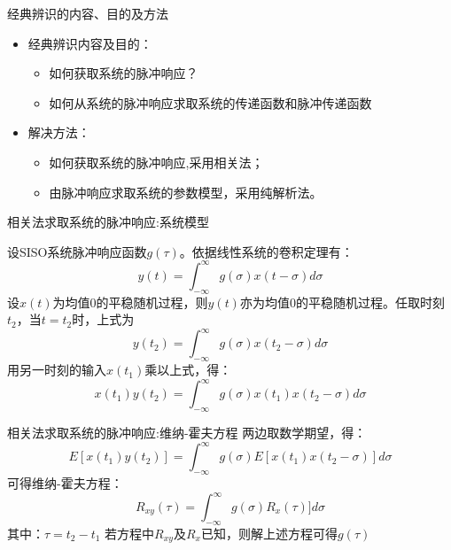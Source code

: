 \begin{frame}{经典辨识的内容、目的及方法}
\begin{itemize}
\item 经典辨识内容及目的：
\begin{itemize}
\item 如何获取系统的脉冲响应？
\item 如何从系统的脉冲响应求取系统的传递函数和脉冲传递函数
\end{itemize}
\item 解决方法：
\begin{itemize}
\item 如何获取系统的脉冲响应,采用相关法；
\item 由脉冲响应求取系统的参数模型，采用纯解析法。
\end{itemize}
\end{itemize}
\end{frame}

\begin{frame}{相关法求取系统的脉冲响应:系统模型}

设SISO系统脉冲响应函数$g(\tau)$。依据线性系统的卷积定理有：
$$
y(t)=\int_{-\infty}^{\infty} g(\sigma)x(t-\sigma)d\sigma
$$
设$x(t)$为均值$0$的平稳随机过程，则$y(t)$亦为均值$0$的平稳随机过程。任取时刻$t_2$，当$t=t_2$时，上式为
$$
y(t_2)=\int_{-\infty}^{\infty} g(\sigma)x(t_2-\sigma)d\sigma
$$
用另一时刻的输入$x(t_1)$乘以上式，得：
$$
x(t_1)y(t_2)=\int_{-\infty}^{\infty} g(\sigma)x(t_1)x(t_2-\sigma)d\sigma
$$
\end{frame}
\begin{frame}{相关法求取系统的脉冲响应:维纳-霍夫方程}
两边取数学期望，得：
$$
E[x(t_1)y(t_2)]=\int_{-\infty}^{\infty} g(\sigma)E[x(t_1)x(t_2-\sigma)]d\sigma
$$
可得维纳-霍夫方程：
$$
R_{xy}(\tau)=\int_{-\infty}^{\infty} g(\sigma)R_x(\tau)]d\sigma
$$
其中：$\tau=t_2-t_1$
若方程中$R_{xy}$及$R_x$已知，则解上述方程可得$g(\tau)$
\end{frame}

